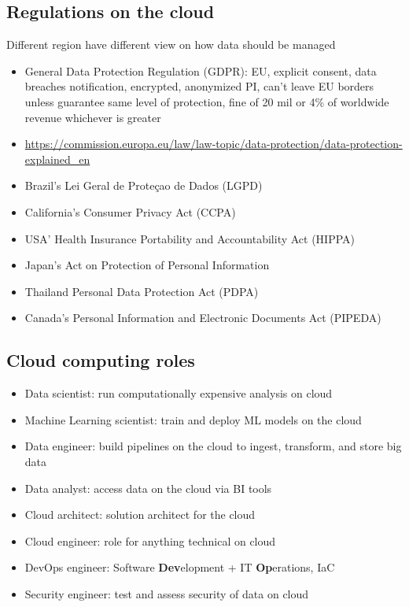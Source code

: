 \subsection{Regulations on the cloud}
Different region have different view on how data should be managed
\begin{itemize}
    \item General Data Protection Regulation (GDPR): EU, explicit consent, data breaches notification, encrypted, anonymized PI, can't leave EU borders unless guarantee same level of protection, fine of 20 mil or 4\% of worldwide revenue whichever is greater
    \item \url{https://commission.europa.eu/law/law-topic/data-protection/data-protection-explained_en}
    \item Brazil's Lei Geral de Proteçao de Dados (LGPD)
    \item California's Consumer Privacy Act (CCPA)
    \item USA' Health Insurance Portability and Accountability Act (HIPPA)
    \item Japan's Act on Protection of Personal Information
    \item Thailand Personal Data Protection Act (PDPA)
    \item Canada's Personal Information and Electronic Documents Act (PIPEDA)
\end{itemize}

\subsection{Cloud computing roles}
\begin{itemize}
    \item Data scientist: run computationally expensive analysis on cloud
    \item Machine Learning scientist: train and deploy ML models on the cloud
    \item Data engineer: build pipelines on the cloud to ingest, transform, and store big data
    \item Data analyst: access data on the cloud via BI tools
    \item Cloud architect: solution architect for the cloud
    \item Cloud engineer: role for anything technical on cloud
    \item DevOps engineer: Software \textbf{Dev}elopment + IT \textbf{Op}erations, IaC
    \item Security engineer: test and assess security of data on cloud
\end{itemize}

